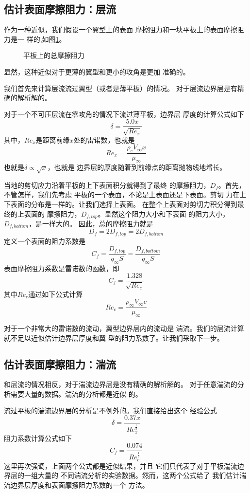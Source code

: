 \subsection{估计表面摩擦阻力：层流}
作为一种近似，我们假设一个翼型上的表面
摩擦阻力和一块平板上的表面摩擦阻力是一
样的,如图\ref{fig:plate}。
\begin{figure}[!ht]
	\centering
	
	\caption{平板上的总摩擦阻力}
	\label{fig:plate}
\end{figure}
显然，这种近似对于更薄的翼型和更小的攻角是更加
准确的。

我们首先来计算层流流过翼型（或者是薄平板）的情况。
对于层流边界层是有精确的解析解的。

对于一个不可压层流在零攻角的情况下流过薄平板，边界层
厚度的计算公式如下
\[
	\delta=\frac{5.0 x}{\sqrt{Re_x}}
\]
其中，$Re_x$是距离前缘$x$处的雷诺数，也就是
\[
	Re_x=\frac{\rho_e V_\infty x }{\mu_\infty}
\]
也就是$\delta \propto \sqrt{x } $，也就是
边界层的厚度随着到前缘点的距离抛物线地增长。

当地的剪切应力沿着平板的上下表面积分就得到了最终
的摩擦阻力，$D_f$。首先，不管怎样，我们先考虑
平板的一个表面，不论是上表面还是下表面。剪切
力在上下表面的分布是一样的。让我们选择上表面。
在整个上表面对剪切力积分得到最终的上表面的
摩擦阻力，$D_{f,top}$。显然这个阻力大小和下表面
的阻力大小，$D_{f,bot tom}$，是一样大的。
因此，总的摩擦阻力就是
\[
	D_f=2D_{f,top}=2D_{f,bot tom}
\]
定义一个表面的阻力系数是
\[
	C_f=\frac{D_{f,top}}{q_\infty S }=\frac{D_{f,bot tom}}{q_\infty S }
\]
表面摩擦阻力系数是雷诺数的函数，即
\[
	C_f=\frac{1.328}{\sqrt{Re_c}}
\]
其中$Re_c$通过如下公式计算
\[
	Re_c=\frac{\rho_\infty V_\infty c }{\mu_\infty}
\]

对于一个非常大的雷诺数的流动，翼型边界层内的流动是
湍流。我们的层流计算就不足以近似估计边界层厚度和翼
型的阻力系数了。让我们采取下一步。

\subsection{估计表面摩擦阻力：湍流}
和层流的情况相反，对于湍流边界层是没有精确的解析解的。
对于任意湍流的分析需要大量的数据。湍流的分析都是近似
的。

流过平板的湍流边界层的分析是不例外的。我们直接给出这个
经验公式
\[
	\delta = \frac{0.37 x }{Re_x ^{\frac{1}{5 }}}
\]
阻力系数计算公式如下
\[
	C_f=\frac{0.074}{Re_c^{\frac{1}{5 }}}
\]
这里再次强调，上面两个公式都是近似结果，并且
它们只代表了对于平板湍流边界层的一组大量的
不同湍流分析的实验数据。然而，这两个公式给了
我们估计湍流边界层厚度和表面摩擦阻力系数的一个
方法。

